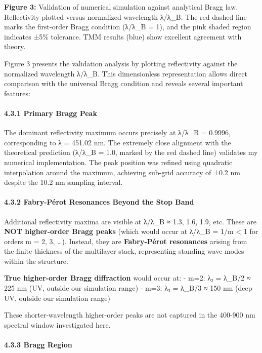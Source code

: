 \documentclass[
]{article}
\begin{document}
\textbf{Figure 3:} Validation of numerical simulation against analytical
Bragg law. Reflectivity plotted versus normalized wavelength λ/λ\_B. The
red dashed line marks the first-order Bragg condition (λ/λ\_B = 1), and
the pink shaded region indicates ±5\% tolerance. TMM results (blue) show
excellent agreement with theory.

Figure 3 presents the validation analysis by plotting reflectivity
against the normalized wavelength λ/λ\_B. This dimensionless
representation allows direct comparison with the universal Bragg
condition and reveals several important features:

\paragraph{4.3.1 Primary Bragg Peak}\label{primary-bragg-peak}

The dominant reflectivity maximum occurs precisely at λ/λ\_B = 0.9996,
corresponding to λ = 451.02 nm. The extremely close alignment with the
theoretical prediction (λ/λ\_B = 1.0, marked by the red dashed line)
validates my numerical implementation. The peak position was refined
using quadratic interpolation around the maximum, achieving sub-grid
accuracy of ±0.2 nm despite the 10.2 nm sampling interval.

\paragraph{4.3.2 Fabry-Pérot Resonances Beyond the Stop
Band}\label{fabry-puxe9rot-resonances-beyond-the-stop-band}

Additional reflectivity maxima are visible at λ/λ\_B ≈ 1.3, 1.6, 1.9,
etc. These are \textbf{NOT higher-order Bragg peaks} (which would occur
at λ/λ\_B = 1/m \textless{} 1 for orders m = 2, 3, \ldots). Instead,
they are \textbf{Fabry-Pérot resonances} arising from the finite
thickness of the multilayer stack, representing standing wave modes
within the structure.

\textbf{True higher-order Bragg diffraction} would occur at: - m=2: λ₂ =
λ\_B/2 ≈ 225 nm (UV, outside our simulation range) - m=3: λ₃ = λ\_B/3 ≈
150 nm (deep UV, outside our simulation range)

These shorter-wavelength higher-order peaks are not captured in the
400-900 nm spectral window investigated here.

\paragraph{4.3.3 Bragg Region}\label{bragg-region}
\end{document}
